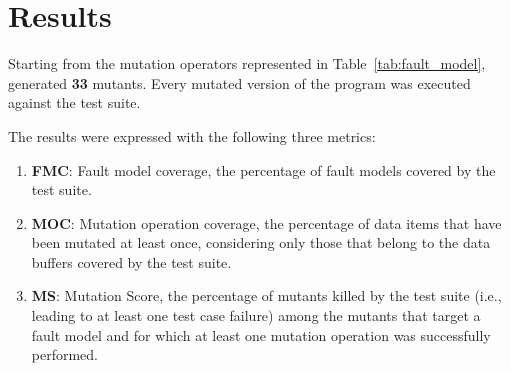 
\chapter{Results}


Starting from the mutation operators represented in Table~\ref{tab:fault_model}, \DAMA generated \textbf{33} mutants. Every mutated version of the program was executed against the \case test suite.

The results were expressed with the following three metrics:
\begin{enumerate}
\item \textbf{FMC}: Fault model coverage, the percentage of fault models covered by the test suite.
\item \textbf{MOC}: Mutation operation coverage, the percentage of data items that have been mutated at least once, considering only those that belong to the data buffers covered by the test suite.
\item \textbf{MS}: Mutation Score, the percentage of mutants killed by the test suite (i.e., leading to at least one test case failure) among the mutants that target a fault model and for which at least one mutation operation was successfully performed.
\end{enumerate}

